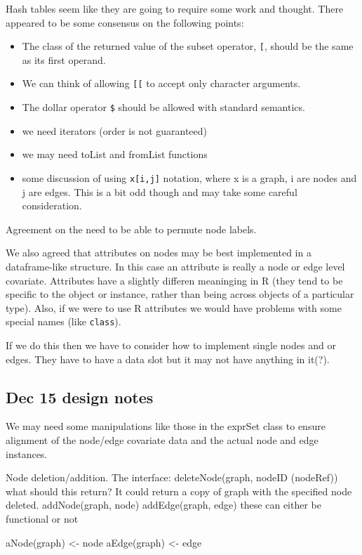 Hash tables seem like they are going to require some work and thought.
There appeared to be some consensus on the following points:
\begin{itemize}
\item The class of the returned value of the subset operator,
  \verb+[+, should be the same as its first operand.
\item We can think of allowing \verb+[[+ to accept only character
  arguments. 
\item The dollar operator \verb+$+ should be allowed with standard
  semantics. 
\item we need iterators (order is not guaranteed)
\item we may need toList and fromList functions
\item some discussion of using \verb+x[i,j]+ notation, where x is a
  graph, i are nodes and j are edges. This is a bit odd though and may
  take some careful consideration.
\end{itemize}

Agreement on the need to be able to permute node labels.

We also agreed that attributes on nodes may be best implemented in a
dataframe-like structure. In this case an attribute is really a node
or edge level covariate. Attributes have a slightly differen
meaninging in R (they tend to be specific to the object or instance,
rather than being across objects of a particular type). Also, if we
were to use R attributes we would have problems with some special
names (like \verb+class+).

If we do this then we have to consider how to implement single nodes
and or edges. They have to have a data slot but it may not have
anything in it(?).


\subsection{Dec 15 design notes}

We may need some manipulations like those in the exprSet class to
ensure alignment of the node/edge covariate data and the actual node
and edge instances.

Node deletion/addition. The interface: 
  deleteNode(graph, nodeID (nodeRef))
what should this return?
It could return a copy of graph with the specified node deleted.
  addNode(graph, node)
  addEdge(graph, edge)
these can either be functional or not

  aNode(graph) <- node
  aEdge(graph) <- edge

